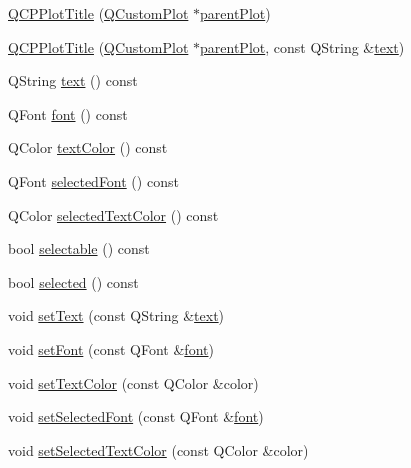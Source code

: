 \begin{DoxyCompactItemize}
\item 
\hyperlink{classQCPPlotTitle_aaae17bee2de6d6a1e695f76fb1abed03}{Q\+C\+P\+Plot\+Title} (\hyperlink{classQCustomPlot}{Q\+Custom\+Plot} $\ast$\hyperlink{classQCPLayerable_ab7e0e94461566093d36ffc0f5312b109}{parent\+Plot})
\item 
\hyperlink{classQCPPlotTitle_a90b9f46ceccbeee41f71c895a8c7ee1f}{Q\+C\+P\+Plot\+Title} (\hyperlink{classQCustomPlot}{Q\+Custom\+Plot} $\ast$\hyperlink{classQCPLayerable_ab7e0e94461566093d36ffc0f5312b109}{parent\+Plot}, const Q\+String \&\hyperlink{classQCPPlotTitle_aeaa6f2384a611e8a610262b976b3cee5}{text})
\item 
Q\+String \hyperlink{classQCPPlotTitle_aeaa6f2384a611e8a610262b976b3cee5}{text} () const 
\item 
Q\+Font \hyperlink{classQCPPlotTitle_aa5f4cf007db51ccdd1c137191f564119}{font} () const 
\item 
Q\+Color \hyperlink{classQCPPlotTitle_a69f2cae768ff84dbf9f8a387ad617781}{text\+Color} () const 
\item 
Q\+Font \hyperlink{classQCPPlotTitle_aa865a3656e01ee8db41837afa892f2a3}{selected\+Font} () const 
\item 
Q\+Color \hyperlink{classQCPPlotTitle_ab2262e40edfc41540c1dbc1c4234f9d2}{selected\+Text\+Color} () const 
\item 
bool \hyperlink{classQCPPlotTitle_a8d75c7cbcf2049c9512a3335d6f11416}{selectable} () const 
\item 
bool \hyperlink{classQCPPlotTitle_a9771f3a4bca026484d7c8b5d953b5e82}{selected} () const 
\item 
void \hyperlink{classQCPPlotTitle_aae5a93e88050dfb2cbf6adc087516821}{set\+Text} (const Q\+String \&\hyperlink{classQCPPlotTitle_aeaa6f2384a611e8a610262b976b3cee5}{text})
\item 
void \hyperlink{classQCPPlotTitle_a199fc7170802ea65006c371875349e37}{set\+Font} (const Q\+Font \&\hyperlink{classQCPPlotTitle_aa5f4cf007db51ccdd1c137191f564119}{font})
\item 
void \hyperlink{classQCPPlotTitle_a71273e3a0ca6b4c151591b37b9e5ce33}{set\+Text\+Color} (const Q\+Color \&color)
\item 
void \hyperlink{classQCPPlotTitle_a5245980ead999ceed51dbe702d0e3131}{set\+Selected\+Font} (const Q\+Font \&\hyperlink{classQCPPlotTitle_aa5f4cf007db51ccdd1c137191f564119}{font})
\item 
void \hyperlink{classQCPPlotTitle_a09ffd8c52ac8824d00382f84be391b66}{set\+Selected\+Text\+Color} (const Q\+Color \&color)

\end{DoxyCompactItemize}
